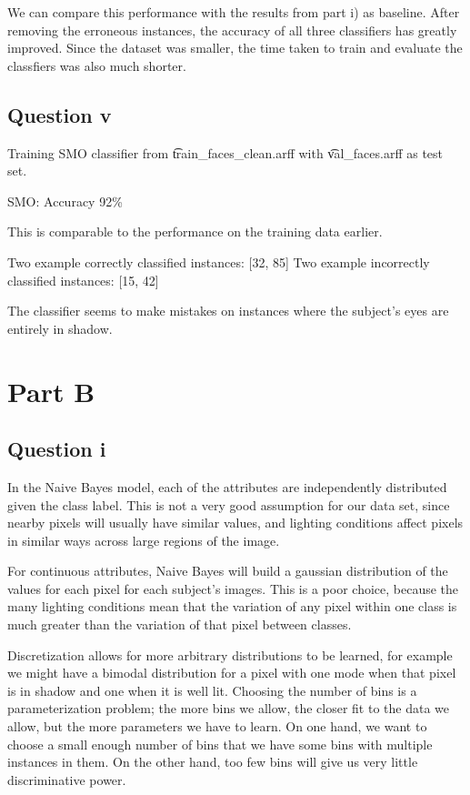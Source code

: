 \documentclass[a4paper]{article}
\begin{document}
We can compare this performance with the results from part i) as baseline. After removing the erroneous instances, the accuracy of all three classifiers has greatly improved. Since the dataset was smaller, the time taken to train and evaluate the classfiers was also much shorter.

\subsection*{Question v}
Training SMO classifier from \t{train_faces_clean.arff} with \t{val_faces.arff} as test set.

SMO: Accuracy 92\%

This is comparable to the performance on the training data earlier.

Two example correctly classified instances: [32, 85]
Two example incorrectly classified instances: [15, 42]

The classifier seems to make mistakes on instances where the subject's eyes are entirely in shadow.

\section*{Part B}
\subsection*{Question i}
In the Naive Bayes model, each of the attributes are independently distributed given the class label. This is not a very good assumption for our data set, since nearby pixels will usually have similar values, and lighting conditions affect pixels in similar ways across large regions of the image.

For continuous attributes, Naive Bayes will build a gaussian distribution of the values for each pixel for each subject's images. This is a poor choice, because the many lighting conditions mean that the variation of any pixel within one class is much greater than the variation of that pixel between classes.

Discretization allows for more arbitrary distributions to be learned, for example we might have a bimodal distribution for a pixel with one mode when that pixel is in shadow and one when it is well lit. Choosing the number of bins is a parameterization problem; the more bins we allow, the closer fit to the data we allow, but the more parameters we have to learn. On one hand, we want to choose a small enough number of bins that we have some bins with multiple instances in them. On the other hand, too few bins will give us very little discriminative power.
\end{document}
